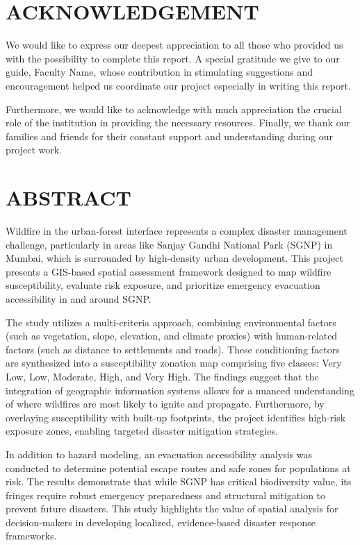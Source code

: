 \documentclass[12pt,a4paper]{article}
\begin{document}
\clearpage
\section*{ACKNOWLEDGEMENT}

We would like to express our deepest appreciation to all those who provided us with the possibility to complete this report. A special gratitude we give to our guide, Faculty Name, whose contribution in stimulating suggestions and encouragement helped us coordinate our project especially in writing this report.


Furthermore, we would like to acknowledge with much appreciation the crucial role of the institution in providing the necessary resources. Finally, we thank our families and friends for their constant support and understanding during our project work.



\clearpage
\section*{ABSTRACT}

Wildfire in the urban-forest interface represents a complex disaster management challenge, particularly in areas like Sanjay Gandhi National Park (SGNP) in Mumbai, which is surrounded by high-density urban development. This project presents a GIS-based spatial assessment framework designed to map wildfire susceptibility, evaluate risk exposure, and prioritize emergency evacuation accessibility in and around SGNP.


The study utilizes a multi-criteria approach, combining environmental factors (such as vegetation, slope, elevation, and climate proxies) with human-related factors (such as distance to settlements and roads). These conditioning factors are synthesized into a susceptibility zonation map comprising five classes: Very Low, Low, Moderate, High, and Very High. The findings suggest that the integration of geographic information systems allows for a nuanced understanding of where wildfires are most likely to ignite and propagate. Furthermore, by overlaying susceptibility with built-up footprints, the project identifies high-risk exposure zones, enabling targeted disaster mitigation strategies.


In addition to hazard modeling, an evacuation accessibility analysis was conducted to determine potential escape routes and safe zones for populations at risk. The results demonstrate that while SGNP has critical biodiversity value, its fringes require robust emergency preparedness and structural mitigation to prevent future disasters. This study highlights the value of spatial analysis for decision-makers in developing localized, evidence-based disaster response frameworks.
\end{document}
